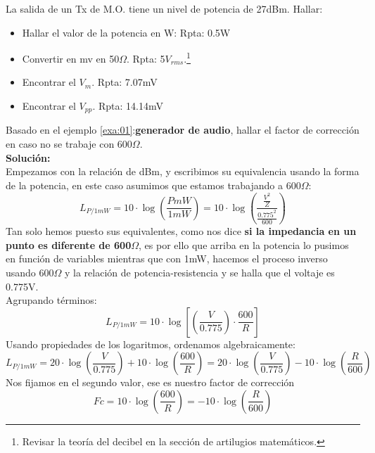 \documentclass[
	11pt, %
	fleqn, %
	a4paper, %
]{LegrandOrangeBook}
\begin{document}
\begin{exercise}
La salida de un Tx de M.O. tiene un nivel de potencia de 27dBm. Hallar:
\begin{itemize}
\item Hallar el valor de la potencia en W: Rpta: 0.5W
\item Convertir en mv en 50$\Omega$. Rpta: 5$V_{rms}$.\footnote{Revisar la teoría del decibel en la sección de artilugios matemáticos.}
\item Encontrar el $V_m$. Rpta: 7.07mV
\item Encontrar el $V_{pp}$. Rpta: 14.14mV
\end{itemize}
\end{exercise}
\begin{example}
Basado en el ejemplo \ref{exa:01}:\textbf{generador de audio}, hallar el factor de corrección en caso no se trabaje con 600$\Omega$.\\
\textbf{Solución:}\\
Empezamos con la relación de dBm, y escribimos su equivalencia usando la forma de la potencia, en este caso asumimos que estamos trabajando a 600$\Omega$:
\begin{displaymath}
L_{P/1mW}=10\cdot\log\left(\frac{PmW}{1mW}\right)=10\cdot\log\left(\frac{\frac{V^2}{Z}}{\frac{0.775^2}{600}}\right)
\end{displaymath}
Tan solo hemos puesto sus equivalentes, como nos dice \textbf{si la impedancia en un punto es diferente de 600$\Omega$}, es por ello que arriba en la potencia lo pusimos en función de variables mientras que con 1mW, hacemos el proceso inverso usando 600$\Omega$ y la relación de potencia-resistencia y se halla que el voltaje es 0.775V.\\Agrupando términos:
\begin{displaymath}
L_{P/1mW}=10\cdot\log\left[\left(\frac{V}{0.775}\right)\cdot\frac{600}{R}\right]
\end{displaymath}
Usando propiedades de los logaritmos, ordenamos algebraicamente:
\begin{displaymath}
L_{P/1mW}=20\cdot\log\left(\frac{V}{0.775}\right)+10\cdot\log\left(\frac{600}{R}\right)=20\cdot\log\left(\frac{V}{0.775}\right)-10\cdot\log\left(\frac{R}{600}\right)
\end{displaymath}
Nos fijamos en el segundo valor, ese es nuestro factor de corrección
\begin{equation*}
\boxed{Fc=10\cdot\log\left(\frac{600}{R}\right)=-10\cdot\log\left(\frac{R}{600}\right)}
\end{equation*}
\end{example}
\end{document}
